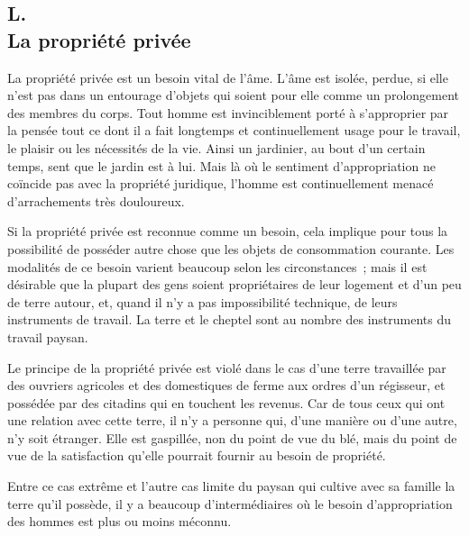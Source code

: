 \documentclass[french,twoside]{book} %
\begin{document}
\subsection[L. La propriété privée]{L. \\
La propriété privée}
\noindent \par
La propriété privée est un besoin vital de l'âme. L'âme est isolée, perdue, si elle n'est pas dans un entourage d'objets qui soient pour elle comme un prolongement des membres du corps. Tout homme est invinciblement porté à s'approprier par la pensée tout ce dont il a fait longtemps et continuellement usage pour le travail, le plaisir ou les nécessités de la vie. Ainsi un jardinier, au bout d'un certain temps, sent que le jardin est à lui. Mais là où le sentiment d'appropriation ne coïncide pas avec la propriété juridique, l'homme est continuellement menacé d'arrachements très douloureux.\par
Si la propriété privée est reconnue comme un besoin, cela implique pour tous la possibilité de posséder autre chose que les objets de consommation courante. Les modalités de ce besoin varient beaucoup selon les circonstances ; mais il est désirable que la plupart des gens soient propriétaires de leur logement et d'un peu de terre autour, et, quand il n'y a pas impossibilité technique, de leurs instruments de travail. La terre et le cheptel sont au nombre des instruments du travail paysan.\par
Le principe de la propriété privée est violé dans le cas d'une terre travaillée par des ouvriers agricoles et des domestiques de ferme aux ordres d'un régisseur, et possédée par des citadins qui en touchent les revenus. Car de tous ceux qui ont une relation avec cette terre, il n'y a personne qui, d'une manière ou d'une autre, n'y soit étranger. Elle est gaspillée, non du point de vue du blé, mais du point de vue de la satisfaction qu'elle pourrait fournir au besoin de propriété.\par
Entre ce cas extrême et l'autre cas limite du paysan qui cultive avec sa famille la terre qu'il possède, il y a beaucoup d'intermédiaires où le besoin d'appropriation des hommes est plus ou moins méconnu.
\end{document}
